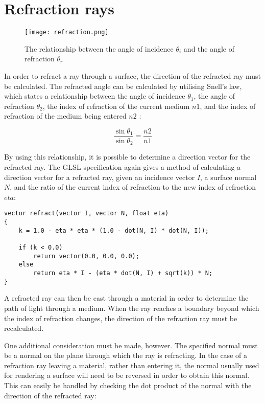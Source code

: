 \section{Refraction rays}
\begin{figure}
\centering
	\texttt{[image: refraction.png]}
	\caption{The relationship between the angle of incidence $\theta_i$ and the angle of refraction $\theta_r$}
	\label{fig:refraction}
\end{figure}

In order to refract a ray through a surface, the direction of the refracted ray must be calculated. The refracted angle can be calculated by utilising Snell's law, which states a relationship between the angle of incidence $\theta_1$, the angle of refraction $\theta_2$, the index of refraction of the current medium $n1$, and the index of refraction of the medium being entered $n2$ \parencite{glassner89introduction}:

\[
	\frac{\sin\theta_1}{\sin\theta_2} = \frac{n2}{n1}
\]

By using this relationship, it is possible to determine a direction vector for the refracted ray. The GLSL specification again gives a method of calculating a direction vector for a refracted ray, given an incidence vector $I$, a surface normal $N$, and the ratio of the current index of refraction to the new index of refraction $eta$:

\newpage
{}
\begin{lstlisting}[frame=single]
vector refract(vector I, vector N, float eta)
{
	k = 1.0 - eta * eta * (1.0 - dot(N, I) * dot(N, I));

	if (k < 0.0) 
		return vector(0.0, 0.0, 0.0);
	else 
		return eta * I - (eta * dot(N, I) + sqrt(k)) * N;
}
\end{lstlisting}

A refracted ray can then be cast through a material in order to determine the path of light through a medium. When the ray reaches a boundary beyond which the index of refraction changes, the direction of the refraction ray must be recalculated.

One additional consideration must be made, however. The specified normal must be a normal on the plane through which the ray is refracting. In the case of a refraction ray leaving a material, rather than entering it, the normal usually used for rendering a surface will need to be reversed in order to obtain this normal. This can easily be handled by checking the dot product of the normal with the direction of the refracted ray:

